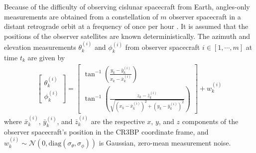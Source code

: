 \documentclass[letterpaper, preprint, paper,11pt]{AAS}	%
\begin{document}
Because of the difficulty of observing cislunar spacecraft from Earth, angles-only measurements are obtained from a constellation of $m$ observer spacecraft in a distant retrograde orbit at a frequency of once per hour \cite{gupta2023constellation}. It is assumed that the positions of the observer satellites are known deterministically. The azimuth and elevation measurements $\theta_k^{(i)}$ and $\phi_k^{(i)}$ from observer spacecraft $i \in [1, \cdots, m]$ at time $t_k$ are given by
\begin{align}
    \begin{bmatrix}
        \theta_k^{(i)} \\
        \phi_k^{(i)}
    \end{bmatrix} = \begin{bmatrix}
        \tan^{-1}\left(\frac{y_k - \bar{y}_k^{(i)}}{x_k - \bar{x}_k^{(i)}}\right) \\
        \tan^{-1}\left(\frac{z_k - \bar{z}_k^{(i)}}{\sqrt{(x_k - \bar{x}_k^{(i)})^2 + (y_k - \bar{y}_k^{(i)})^2}}\right)
    \end{bmatrix} + w_k^{(i)}
\end{align}
\noindent where $\bar{x}_k^{(i)}$, $\bar{y}_k^{(i)}$, and $\bar{z}_k^{(i)}$ are the respective $x$, $y$, and $z$ components of the observer spacecraft's position in the CR3BP coordinate frame, and $w_k^{(i)} \sim \mathcal{N}(0, \text{diag}(\sigma_\theta, \sigma_\phi))$ is Gaussian, zero-mean measurement noise. 
\end{document}
